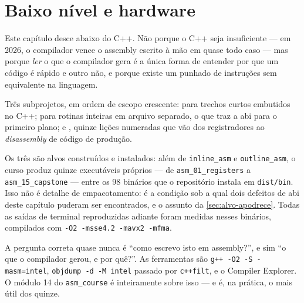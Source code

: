 
\section{Baixo nível e hardware}
\label{sec:baixo-nivel}

Este capítulo desce abaixo do C++. Não porque o C++ seja insuficiente --- em
2026, o compilador vence o assembly escrito à mão em quase todo caso --- mas
porque \emph{ler} o que o compilador gera é a única forma de entender por que um
código é rápido e outro não, e porque existe um punhado de instruções sem
equivalente na linguagem.

Três subprojetos, em ordem de escopo crescente:  para
trechos curtos embutidos no C++;  para rotinas inteiras em
arquivo separado, o que traz a \gls{abi} para o primeiro plano; e
, quinze lições numeradas que vão dos registradores ao
\emph{disassembly} de código de produção.

Os três são alvos construídos e instalados: além de \texttt{inline\_asm} e
\texttt{outline\_asm}, o curso produz quinze executáveis próprios --- de
\texttt{asm\_01\_registers} a \texttt{asm\_15\_capstone} --- entre os 98
binários que o repositório instala em \texttt{dist/bin}. Isso não é detalhe de
empacotamento: é a condição sob a qual dois defeitos de \gls{abi} deste
capítulo puderam ser encontrados, e o assunto da \cref{sec:alvo-apodrece}.
Todas as saídas de terminal reproduzidas adiante foram medidas nesses binários,
compilados com \texttt{-O2 -msse4.2 -mavx2 -mfma}.

\begin{regra}
A pergunta correta quase nunca é ``como escrevo isto em assembly?'', e sim ``o
que o compilador gerou, e por quê?''. As ferramentas são
\texttt{g++ -O2 -S -masm=intel}, \texttt{objdump -d -M intel} passado por
\texttt{c++filt}, e o Compiler Explorer. O módulo 14 do \texttt{asm\_course} é
inteiramente sobre isso --- e é, na prática, o mais útil dos quinze.
\end{regra}

